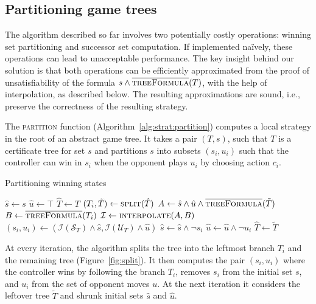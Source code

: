 \subsection{Partitioning game trees}

The algorithm described so far involves two potentially costly operations: winning set partitioning and successor set computation.  If implemented na\"ively, these operations can lead to unacceptable performance.  The key insight behind our solution is that both operations can be efficiently approximated from the proof of unsatisfiability of the formula $s \land \textsc{$\overline{\mbox{treeFormula}}$}(T)$, with the help of interpolation, as described below.  The resulting approximations are sound, i.e., preserve the correctness of the resulting strategy.

The \textsc{partition} function (Algorithm~\ref{alg:strat:partition}) computes a local strategy in the root of an abstract game tree.  It takes a pair $(T, s)$, such that $T$ is a certificate tree for set $s$ and partitions $s$ into subsets $(s_i, u_i)$ such that the controller can win in $s_i$ when the opponent plays $u_i$ by choosing action $c_i$.

\begin{algorithm}[t]
   \caption{Partitioning winning states}\label{alg:strat:partition}
   \begin{algorithmic}[1]
        \State $\hat{s} \gets s$
        \State $\hat{u} \gets \top$
        \State $\hat{T} \gets T$
        \State $(T_i, \tilde{T}) \gets \Call{split}{\hat{T}}$\label{alg:partition:split}
            \State $A \gets \hat{s} \land \hat{u} \land \Call{\opptf}{\tilde{T}} $ \label{alg:strat:partition:Bi}
            \State $B \gets \Call{\opptf}{T_i} $ \label{alg:strat:partition:Ai}
            \State $\mathcal{I} \gets \Call{interpolate}{A, B}$\label{alg:partition:I}
            \State $(s_i, u_i) \gets (\mathcal{I}(\mathcal{S}_T) \land \hat{s}, \mathcal{I}(\mathcal{U}_T) \land \hat{u})$\label{alg:partition:Ii}
            \State $\hat{s} \gets \hat{s} \land \neg s_i$
            \State $\hat{u} \gets \hat{u} \land \neg u_i$
            \State $\hat{T} \gets \tilde{T}$\label{alg:partition:upd}
        \EndFor
        \State \Return{$[(T_1, s_1, u_1),\ldots, (T_j, s_j, u_j)]$} \label{alg:strat:partition:return}
        \EndFunction
    \end{algorithmic}
\end{algorithm}

At every iteration, the algorithm splits the tree into the leftmost branch $T_i$ and the remaining tree (Figure~\ref{fig:split}).  It then computes the pair $(s_i, u_i)$ where the controller wins by following the branch $T_i$, removes $s_i$ from the initial set $s$, and $u_i$ from the set of opponent moves $u$.  At the next iteration it considers the leftover tree $\tilde{T}$ and shrunk initial sets $\hat{s}$ and $\hat{u}$.

